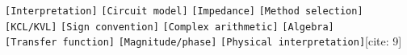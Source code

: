 \documentclass[11pt, a4paper]{article}
\begin{document}
\vspace{0.4cm}
\begin{tcolorbox}[colback=gray!10, colframe=gray!50!black, title=\textbf{Etiquetas Diagnósticas (Para registrar en Follow-up)[cite: 9]}]
    \texttt{[Interpretation]} \quad \texttt{[Circuit model]} \quad \texttt{[Impedance]} \quad \texttt{[Method selection]} \\
    \texttt{[KCL/KVL]} \quad \texttt{[Sign convention]} \quad \texttt{[Complex arithmetic]} \quad \texttt{[Algebra]} \\
    \texttt{[Transfer function]} \quad \texttt{[Magnitude/phase]} \quad \texttt{[Physical interpretation]}[cite: 9]
\end{tcolorbox}
\end{document}
